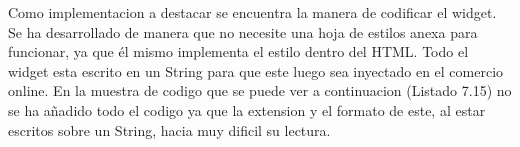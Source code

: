 Como implementacion a destacar se encuentra la manera de codificar el widget. Se ha desarrollado de manera que no necesite una hoja de estilos anexa para funcionar, ya que él mismo implementa el estilo dentro del HTML. Todo el widget esta escrito en un String para que este luego sea inyectado en el comercio online. En la muestra de codigo que se puede ver a continuacion (Listado 7.15) no se ha añadido todo el codigo ya que la extension y el formato de este, al estar escritos sobre un String, hacia muy dificil su lectura.\\

